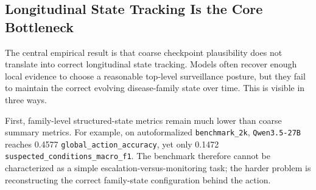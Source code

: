 \begin{table}[t]
\centering
\caption{Primary autoformalized \texttt{benchmark\_2k} results. This is the main benchmark table because it evaluates the full 2{,}000-stay rolling surveillance task and directly scores structured disease-family recovery plus patient-level temporal quality.}
\label{tab:surv_main_benchmark2k}
\end{table}

\subsection{Longitudinal State Tracking Is the Core Bottleneck}

The central empirical result is that coarse checkpoint plausibility does not translate into correct longitudinal state tracking. Models often recover enough local evidence to choose a reasonable top-level surveillance posture, but they fail to maintain the correct evolving disease-family state over time. This is visible in three ways.

First, family-level structured-state metrics remain much lower than coarse summary metrics. For example, on autoformalized \texttt{benchmark\_2k}, \texttt{Qwen3.5-27B} reaches 0.4577 \texttt{global\_action\_accuracy}, yet only 0.1472 \texttt{suspected\_conditions\_macro\_f1}. The benchmark therefore cannot be characterized as a simple escalation-versus-monitoring task; the harder problem is reconstructing the correct family-state configuration behind the action.

